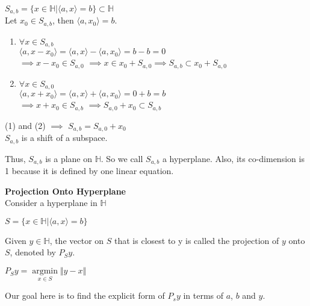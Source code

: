 \documentclass{article}
\begin{document}
\begin{center}
\end{center}

\pagebreak
$S_{a,b} = \{x \in \mathbb{H} | \langle a,x\rangle  = b\} \subset \mathbb{H}$
\\
Let $x_0 \in S_{a,b}$, then $\langle a,x_0\rangle  = b$.
\begin{enumerate}
    \item $\forall x \in S_{a,b}$ \\
    $\langle a, x - x_0\rangle  = \langle a, x\rangle  - \langle a, x_0\rangle  = b - b = 0$ \\
    $\implies x - x_0 \in S_{a,0}$
    $\implies x \in x_0 + S_{a,0} \implies S_{a,b} \subset x_0 + S_{a,0}$
    \item $\forall x \in S_{a,0}$ \\
    $\langle a,x+x_0\rangle  = \langle a,x\rangle  + \langle a,x_0\rangle  = 0 + b = b$ \\
    $\implies x + x_0 \in S_{a,b}$ 
    $\implies S_{a,0} + x_0 \subset S_{a,b}$
\end{enumerate}

(1) and (2) $\implies$ $S_{a,b} = S_{a,0} + x_0$ \\
$S_{a,b}$ is a shift of a subspace.

\begin{center}
\end{center}

Thus, $S_{a,b}$ is a plane on $\mathbb{H}$. So we call $S_{a,b}$ a hyperplane. Also, its co-dimension is 1 because it is defined by one linear equation.

\bigbreak
\textbf{Projection Onto Hyperplane} \\
Consider a hyperplane in $\mathbb{H}$
\begin{center}
    $S = \{x \in \mathbb{H} | \langle a,x\rangle  = b\}$
\end{center}
Given $y \in \mathbb{H}$, the vector on $S$ that is closest to y is called the projection of $y$ onto $S$, denoted by $P_Sy$.
\begin{center}
    \item $P_Sy = \underset{x \in S}{\operatorname*{argmin}} \Vert y - x \Vert$ 
\end{center}
Our goal here is to find the explicit form of $P_sy$ in terms of $a$, $b$ and $y$.

\begin{center}
\end{center}
\end{document}
